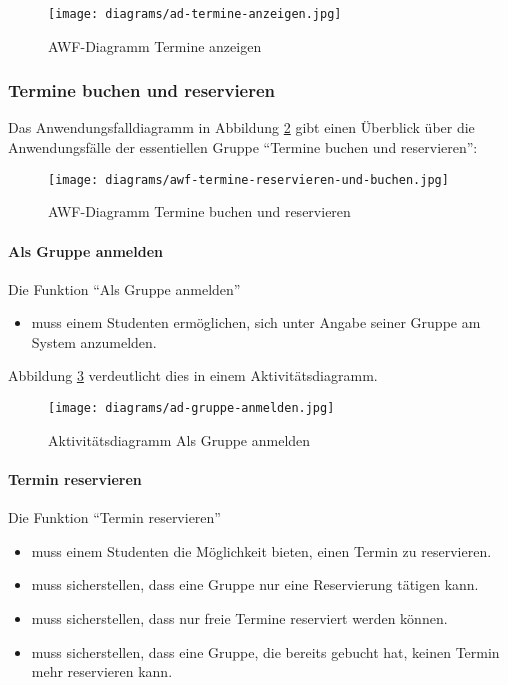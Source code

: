 \begin{figure}
  \centering
  \texttt{[image: diagrams/ad-termine-anzeigen.jpg]}
  \caption{AWF-Diagramm Termine anzeigen}
  \label{fig:ad-termine-anzeigen}
\end{figure}

\subsubsection{Termine buchen und reservieren}

Das Anwendungsfalldiagramm in Abbildung \ref{fig:awf-termine-reservieren-und-buchen} gibt einen Überblick über die Anwendungsfälle der essentiellen Gruppe ``Termine buchen und
reservieren'':

\begin{figure}
  \centering
  \texttt{[image: diagrams/awf-termine-reservieren-und-buchen.jpg]}
  \caption{AWF-Diagramm Termine buchen und reservieren}
  \label{fig:awf-termine-reservieren-und-buchen}
\end{figure}

\paragraph{Als Gruppe anmelden}

Die Funktion ``Als Gruppe anmelden''
\begin{itemize}
  \item muss einem Studenten ermöglichen, sich unter Angabe seiner Gruppe am System anzumelden.
\end{itemize}

Abbildung \ref{fig:ad-gruppe-anmelden} verdeutlicht dies in einem Aktivitätsdiagramm.

\begin{figure}
  \centering
  \texttt{[image: diagrams/ad-gruppe-anmelden.jpg]}
  \caption{Aktivitätsdiagramm Als Gruppe anmelden}
  \label{fig:ad-gruppe-anmelden}
\end{figure}

\paragraph{Termin reservieren}

Die Funktion ``Termin reservieren''
\begin{itemize}
  \item muss einem Studenten die Möglichkeit bieten, einen Termin zu reservieren.
  \item muss sicherstellen, dass eine Gruppe nur eine Reservierung tätigen kann.
  \item muss sicherstellen, dass nur freie Termine reserviert werden können.
  \item muss sicherstellen, dass eine Gruppe, die bereits gebucht hat, keinen Termin mehr reservieren kann.
\end{itemize}

